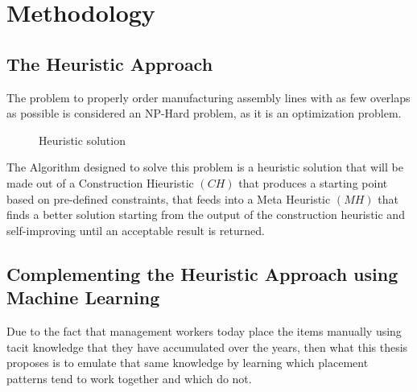 \documentclass[12pt,a4paper]{report}
\begin{document}
\chapter{Methodology}
\section{The Heuristic Approach}

The problem to properly order manufacturing assembly lines with as few overlaps as possible is considered an NP-Hard problem, as it is an optimization problem.

\begin{figure}[ht]
    \centering

    \caption{Heuristic solution}
    \label{fig:solution}
\end{figure}

The Algorithm designed to solve this problem is a heuristic solution that will be made out of a Construction Hieuristic $(C\!H)$ that produces a starting point based on pre-defined constraints, that feeds into a Meta Heuristic $(M\!H)$ that finds a better solution starting from the output of the construction heuristic and self-improving until an acceptable result is returned. 

\section{Complementing the Heuristic Approach using Machine Learning}
Due to the fact that management workers today place the items manually using tacit knowledge that they have accumulated over the years, then what this thesis proposes is to emulate that same knowledge by learning which placement patterns tend to work together and which do not.
\end{document}
